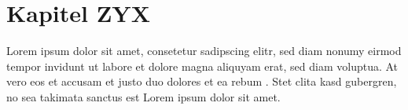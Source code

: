 

\chapter{Kapitel ZYX}
\label{ch:ZYK}

Lorem ipsum dolor sit amet, consetetur sadipscing elitr, sed diam nonumy eirmod
tempor invidunt ut labore et dolore magna aliquyam erat, sed diam voluptua. At
vero eos et accusam et justo duo dolores et ea rebum \cite{qosr}. Stet clita
kasd gubergren, no sea takimata sanctus est Lorem ipsum dolor sit amet.

